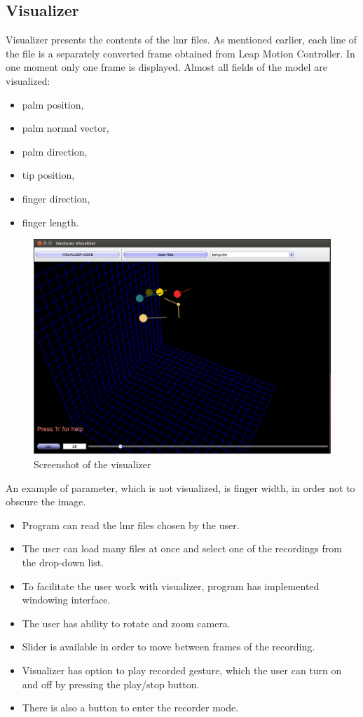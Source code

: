 \subsection{Visualizer}
Visualizer presents the contents of the lmr files. As mentioned earlier, each line of the file is a separately converted frame obtained from Leap Motion Controller. In one moment only one frame is displayed.
Almost all fields of the model are visualized:
\begin{itemize}
\item palm position,
\item palm normal vector,
\item palm direction,
\item tip position,
\item finger direction,
\item finger length.
\end{itemize}

\begin{figure}[htb]
\centering
 \includegraphics[width=1\columnwidth]{figures/visualizer.png}
 \caption{Screenshot of the visualizer}
 \label{visualizer}
\end{figure}

An example of parameter, which is not visualized, is finger width, in order not to obscure the image.
\begin{itemize}
\item Program can read the lmr files chosen by the user.
\item The user can load many files at once and select one of the recordings from the drop-down list.
\item To facilitate the user work with visualizer, program has implemented windowing interface.
\item The user has ability to rotate and zoom camera.
\item Slider is available in order to move between frames of the recording.
\item Visualizer has option to play recorded gesture, which the user can turn on and off by pressing the play/stop button.
\item There is also a button to enter the recorder mode.
\end{itemize}

